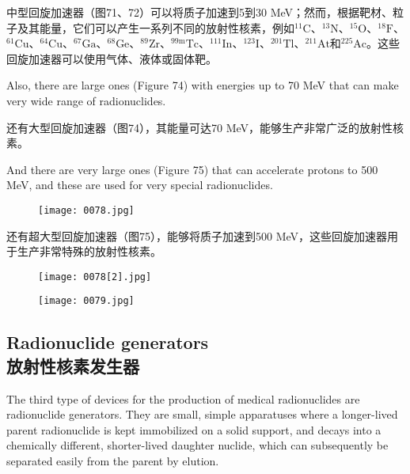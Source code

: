 \documentclass[dvipsnames, svgnames,a4paper,11pt]{article}
\begin{document}
中型回旋加速器（图71、72）可以将质子加速到5到30 MeV；然而，根据靶材、粒子及其能量，它们可以产生一系列不同的放射性核素，例如$^{11}\text{C}$、$^{13}\text{N}$、$^{15}\text{O}$、$^{18}\text{F}$、$^{61}\text{Cu}$、$^{64}\text{Cu}$、$^{67}\text{Ga}$、$^{68}\text{Ge}$、$^{89}\text{Zr}$、$^{99\text{m}}\text{Tc}$、$^{111}\text{In}$、$^{123}\text{I}$、$^{201}\text{Tl}$、$^{211}\text{At}$和$^{225}\text{Ac}$。这些回旋加速器可以使用气体、液体或固体靶。


Also, there are large ones (Figure 74) with energies up to 70 MeV that can make very wide range of radionuclides.

还有大型回旋加速器（图74），其能量可达70 MeV，能够生产非常广泛的放射性核素。

And there are very large ones (Figure 75) that can accelerate protons to 500 MeV, and these are used for very special radionuclides.

\begin{figure}[ht]
    \centering
    \texttt{[image: 0078.jpg]}
     \label{fig73}
\end{figure}

还有超大型回旋加速器（图75），能够将质子加速到500 MeV，这些回旋加速器用于生产非常特殊的放射性核素。

\begin{figure}[ht]
    \centering
    \texttt{[image: 0078[2].jpg]}
     \label{fig74}
\end{figure}

\begin{figure}[H]
    \centering
    \texttt{[image: 0079.jpg]}
     \label{fig75}
\end{figure}

\subsection{Radionuclide generators\\放射性核素发生器}

The third type of devices for the production of medical radionuclides are radionuclide generators. They are small, simple apparatuses where a longer-lived parent radionuclide is kept immobilized on a solid support, and decays into a chemically different, shorter-lived daughter nuclide, which can subsequently be separated easily from the parent by elution.
\end{document}
